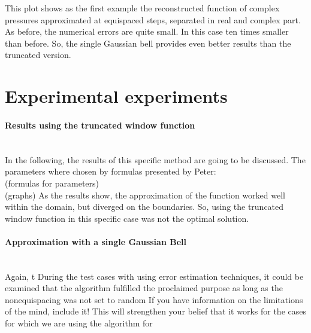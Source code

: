 \documentclass[11pt]{report} %
\begin{document}
This plot shows as the first example the reconstructed function of complex pressures approximated at equispaced steps, separated in real and complex part.
As before, the numerical errors are quite small.
In this case ten times smaller than before. 
So, the single Gaussian bell provides even better results than the truncated version. 


\section{Experimental experiments}
\paragraph{Results using the truncated window function} $ $ \\[1ex]
In the following, the results of this specific method are going to be discussed.
The parameters where chosen by formulas presented by Peter: \\
	(formulas for parameters) \\
	(graphs)
As the results show, the approximation of the function worked well within the domain, but diverged on the boundaries.
So, using the truncated window function in this specific case was not the optimal solution. \\[1ex]

\paragraph{Approximation with a single Gaussian Bell}  $ $ \\[1ex]

Again, t
During the test cases with using error estimation techniques, it could be examined that the algorithm fulfilled the proclaimed purpose as long as the nonequispacing was not set to random {\color{red} If you have information on the limitations of the mind, include it! This will strengthen your belief that it works for the cases for which we are using the algorithm for}
\end{document}

